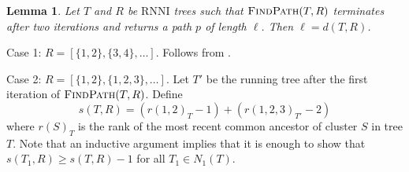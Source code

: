 \documentclass{amsart}
\newtheorem{lemma}{Lemma}
\newcommand{\rnni}{\mathrm{RNNI}}
\newcommand{\findpath}{\textsc{FindPath}}
\begin{document}
\begin{lemma}
Let $T$ and $R$ be $\rnni$ trees such that $\findpath(T, R)$ terminates after two iterations and returns a path $p$ of length $\ell$.
Then $\ell = d(T, R)$.
\end{lemma}

\proof
Case 1: $R = [\{1, 2\}, \{3, 4\}, \ldots]$.
Follows from \autocite{Collienne2019-ca}.

Case 2: $R = [\{1, 2\}, \{1, 2, 3\}, \ldots]$.
Let $T'$ be the running tree after the first iteration of $\findpath(T, R)$.
Define
\[
s(T, R) = (r(1, 2)_T - 1) + (r(1, 2, 3)_{T'} - 2)
\]
where $r(S)_T$ is the rank of the most recent common ancestor of cluster $S$ in tree $T$.
Note that an inductive argument implies that it is enough to show that $s(T_1, R) \geq s(T, R) - 1$ for all $T_1 \in N_1(T)$.
\endproof
\end{document}
